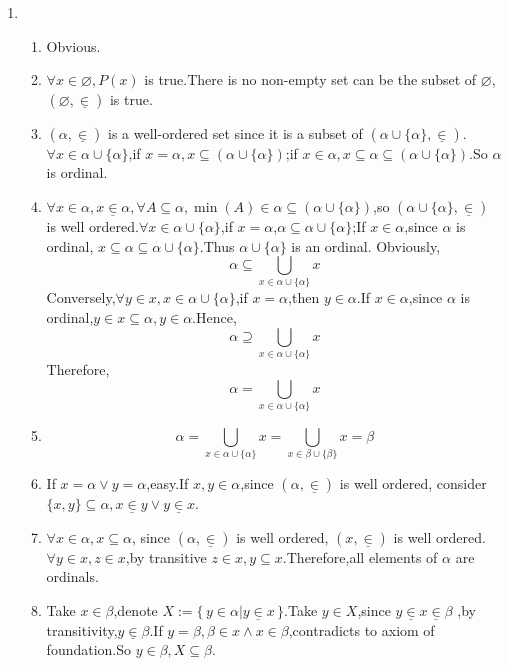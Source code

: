 \documentclass[12pt]{article}
\begin{document}
\begin{enumerate}
    \item 
        \begin{enumerate}
            \item Obvious.
            \item $\forall x\in \varnothing,P(x)$ is true.There is no non-empty set can be the subset of $\varnothing$,$(\varnothing,\underline{\in})$ is true.
            \item  $(\alpha,\underline {\in})$ is a well-ordered set since it is a subset of $\left(\alpha\cup \{\alpha\},\underline{\in}\right)$.
                $\forall x\in \alpha\cup\{\alpha\}$,if $x=\alpha,x\subseteq(\alpha\cup\{\alpha\})$;if $x\in \alpha ,x\subseteq \alpha\subseteq(\alpha\cup\{\alpha\})$.So $\alpha$ is ordinal.
            \item $\forall x\in \alpha,x\underline{\in }\alpha,\forall A\subseteq\alpha,\min(A)\in \alpha\subseteq(\alpha\cup\{\alpha\})$,so $\left(\alpha\cup\{\alpha\},\underline{\in}\right)$ is well ordered.$\forall x\in \alpha\cup \{\alpha\}$,if $x=\alpha$,$\alpha\subseteq\alpha\cup\{\alpha\}$;If $x\in \alpha$,since $\alpha$ is ordinal, $x\subseteq \alpha\subseteq\alpha\cup\{\alpha\}$.Thus $\alpha\cup\{\alpha\}$ is an ordinal.
                \newline
                Obviously,$$\alpha\subseteq\bigcup_{x\in \alpha\cup\{\alpha\}}x$$ 
                Conversely,$\forall y\in x,x\in \alpha\cup\{\alpha\}$,if $x=\alpha$,then $y\in \alpha$.If $x\in \alpha$,since $\alpha$ is ordinal,$y\in x\subseteq \alpha,y\in \alpha$.Hence,
                $$\alpha\supseteq\bigcup_{x\in \alpha\cup\{\alpha\}}x$$
                Therefore,
                $$\alpha=\bigcup_{x\in \alpha\cup\{\alpha\}}x$$   
            \item $$\alpha=\bigcup_{x\in \alpha\cup\{\alpha\}}x=\bigcup_{x\in \beta\cup\{\beta\}}x=\beta$$
            \item If $x=\alpha\vee y=\alpha$,easy.If $x,y\in \alpha$,since $(\alpha,\underline{\in})$ is well ordered, consider $\{x,y\}\subseteq \alpha,x\underline{\in}y\vee y\underline{\in}x$.
            \item $\forall x\in \alpha,x\subseteq \alpha$, since $(\alpha,\underline{\in})$ is well ordered, $(x,\underline{\in})$ is well ordered.$\forall y\in x,z\in x$,by transitive $z\in x,y\subseteq x$.Therefore,all elements of $\alpha$ are ordinals.
            \item Take $x\in \beta$,denote $X:=\{\,y\in \alpha|y\underline{\in }x\,\}$.Take $y\in X$,since $y\underline{\in}x\underline{\in }\beta$ ,by transitivity,$y\underline{\in }\beta$.If $y=\beta,\beta\in x\wedge x\in \beta$,contradicts to axiom of foundation.So $y\in \beta,X\subseteq \beta$.

\end{enumerate}
\end{enumerate}
\end{document}
